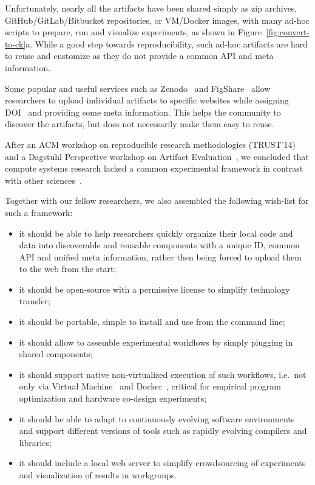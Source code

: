 Unfortunately, nearly all the artifacts have been shared simply as zip
archives, GitHub/GitLab/Bitbucket repositories, or VM/Docker images, with many
ad-hoc scripts to prepare, run and visualize experiments, as shown in
Figure~\ref{fig:convert-to-ck}a.
%
While a good step towards reproducibility, such ad-hoc artifacts are hard to
reuse and customize as they do not provide a common API and meta information.

Some popular and useful services such as Zenodo~\cite{zenodo} and
FigShare~\cite{figshare} allow researchers to upload individual artifacts to
specific websites while assigning DOI~\cite{doi} and providing some meta
information.
%
This helps the community to discover the artifacts, but does not necessarily
make them easy to reuse.

After an ACM workshop on reproducible research methodologies (TRUST'14)~\cite{trust2014}
and a Dagstuhl Perspective workshop on Artifact Evaluation~\cite{childers2016artifact},
we concluded that compute systems research lacked a common experimental
framework in contrast with other sciences~\cite{doi:10.1093/bioinformatics/bth361}.

Together with our fellow researchers, we also assembled the following wish-list
for such a framework:

\begin{itemize}

\item it should be able to help researchers quickly organize their local code
and data into discoverable and reusable components with a unique ID, common API
and unified meta information, rather then being forced to upload them to the
web from the start;

\item it should be open-source with a permissive license to simplify technology
transfer;

\item it should be portable, simple to install and use from the command line;

\item it should allow to assemble experimental workflows by simply plugging in
shared components;

\item it should support native non-virtualized execution of such workflows,
i.e.\ not only via Virtual Machine~\cite{Smith:2005:AVM:1069588.1069632} and
Docker~\cite{docker}, critical for empirical program optimization and hardware
co-design experiments;

\item it should be able to adapt to continuously evolving software environments
and support different versions of tools such as rapidly evolving
compilers and libraries;

\item it should include a local web server to simplify crowdsourcing of
experiments and visualization of results in workgroups.

\end{itemize}

